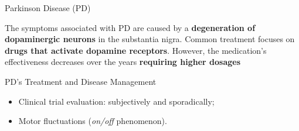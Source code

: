 \documentclass{beamer}
\begin{document}
%	
%
%


\begin{frame}{Parkinson Disease (PD)}  
  \begin{block}{}
The symptoms associated with PD are caused by a \textbf{degeneration of dopaminergic neurons} in the substantia nigra. Common treatment focuses on \textbf{drugs that activate dopamine receptors}. However, the medication's effectiveness decreases over the years \textbf{requiring higher dosages}
  \end{block} 
\end{frame}

\begin{frame}{PD's Treatment and Disease Management} 
    \begin{block}{}
      \begin{itemize}
					\item Clinical trial evaluation: subjectively and sporadically;
					\item Motor fluctuations (\textit{on/off} phenomenon).
     \end{itemize}
  \end{block}
\end{frame}
\end{document}
